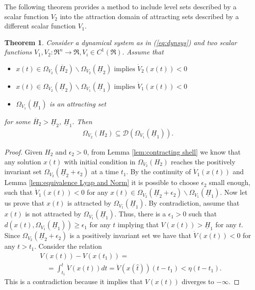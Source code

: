 \documentclass[letterpaper,10pt,twocolumn,journal,final]{IEEEtran}
\newtheorem{thm}{Theorem}[section]
\newcommand{\eps}{\epsilon}
\begin{document}
The following theorem provides a method to include level sets described by a scalar function $V_2$ into the attraction domain of attracting sets described by a different scalar function $V_1$.
\begin{thm}\label{thm:nestedLyap}
	Consider a dynamical system as in (\ref{eq:dynsys}) and two scalar functions
	$V_1, V_2:\Re^n\rightarrow \Re, V_i\in C^{1}(\Re)$.
	Assume that
	\begin{itemize}
		\item $x(t)\in\Omega_{V_2}(\overline H_2)\backslash \Omega_{V_2}(\underline H_2) \text{ implies } \dot V_2(x(t))<0$
		\item $x(t)\in\Omega_{V_2}(\underline H_2)\backslash \Omega_{V_1}(\underline H_1) \text{ implies } \dot V_1(x(t))<0$
		\item $\Omega_{V_1}(\underline H_1)$ is an attracting set
	\end{itemize}
	for some $\overline H_2 > \underline H_2$, $\underline H_1$.
	Then
	\begin{align}
		\Omega_{V_2}(H_2)\subseteq \mathcal{D}(\Omega_{V_1}(\underline H_1)).
	\end{align}
\end{thm}
\begin{proof}
	Given $H_2$ and $\eps_2>0$, from Lemma \ref{lem:contracting shell} we know that any solution $x(t)$ with initial condition in $\Omega_{V_2}(H_2)$ reaches the positively invariant set $\Omega_{V_2}(\underline H_2+\eps_2)$ at a time $t_1$.
	By the continuity of $\dot V_1(x(t))$ and Lemma \ref{lem:equivalence Lyap and Norm} it is possible to choose $\eps_2$ small enough, such that $\dot V_1(x(t))<0$ for any $x(t) \in \Omega_{V_2}(\underline H_2+\eps_2)\backslash \Omega_{V_1}(\underline H_1)$. Now let us prove that $x(t)$ is attracted by $\Omega_{V_1}(\underline H_1)$.
	By contradiction, assume that $x(t)$ is not attracted by $\Omega_{V_1}(\underline H_1)$. Thus, there is a $\eps_1>0$ such that $d(x(t),\Omega_{V_1}(\underline H_1))\geq \eps_1$ for any $t$ implying that $V(x(t))>\underline H_1$ for any $t$.
	Since $\Omega_{V_2}(\underline H_2+\eps_2)$ is a positively invariant set we have that $\dot V(x(t))<0$ for any $t>t_1$.
	Consider the relation
	\begin{align}
		&V(x(t))-V(x(t_1))=\\
		&\quad=\int_{t_1}^{t} \dot V(x(t))dt=\dot V(x(\hat t)) (t-t_1)<\eta(t-t_1).
	\end{align}
	This is a contradiction because it implies that $V(x(t))$ diverges to $-\infty$.
\end{proof}
\end{document}
